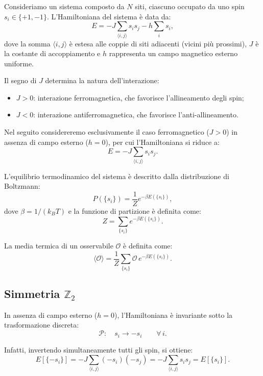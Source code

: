 Consideriamo un sistema composto da $N$ siti, ciascuno occupato da uno spin $s_i \in \{+1, -1\}$.
L’Hamiltoniana del sistema è data da:
\begin{equation}
E = -J \sum_{\langle i,j \rangle} s_i s_j - h \sum_{i} s_i ,
\end{equation}
dove la somma $\langle i,j \rangle$ è estesa alle coppie di siti adiacenti (vicini più prossimi),
$J$ è la costante di accoppiamento e $h$ rappresenta un campo magnetico esterno uniforme.

Il segno di $J$ determina la natura dell’interazione:
\begin{itemize}
\item $J > 0$: interazione ferromagnetica, che favorisce l’allineamento degli spin;
\item $J < 0$: interazione antiferromagnetica, che favorisce l’anti-allineamento.
\end{itemize}

Nel seguito considereremo esclusivamente il caso ferromagnetico ($J>0$) in assenza di campo esterno ($h=0$),
per cui l’Hamiltoniana si riduce a:
\[
E = -J \sum_{\langle i,j \rangle} s_i s_j .
\]

L’equilibrio termodinamico del sistema è descritto dalla distribuzione di Boltzmann:
\[
P(\{s_i\}) = \frac{1}{Z} e^{-\beta E(\{s_i\})},
\]
dove $\beta = 1/(k_B T)$ e la funzione di partizione è definita come:
\begin{equation}
Z = \sum_{\{s_i\}} e^{-\beta E(\{s_i\})}.
\end{equation}

La media termica di un osservabile $\mathcal{O}$ è definita come:
\begin{equation}
\langle \mathcal{O} \rangle =
\frac{1}{Z} \sum_{\{s_i\}} \mathcal{O}\, e^{-\beta E(\{s_i\})}.
\end{equation}

\subsection{Simmetria $\mathbb{Z}_2$}
In assenza di campo esterno ($h=0$), l’Hamiltoniana è invariante sotto la trasformazione discreta:
\begin{equation}
\mathcal{P}:\quad s_i \longrightarrow -s_i \qquad \forall\, i .
\end{equation}

Infatti, invertendo simultaneamente tutti gli spin, si ottiene:
\begin{equation}
E[\{-s_i\}] = -J \sum_{\langle i,j \rangle} (-s_i)(-s_j)
= -J \sum_{\langle i,j \rangle} s_i s_j = E[\{s_i\}].
\end{equation}

